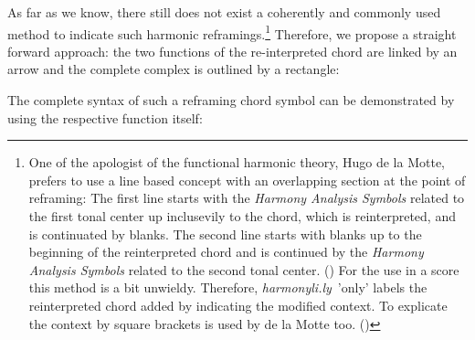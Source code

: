 \documentclass[
  DIV=calc,
  BCOR=5mm,
  12pt,
  headings=small,
  oneside,
  abstract=true,
  toc=bib,
  xcolor=dvipsnames,
  openany,
  ngerman,english]{scrartcl}
\newcommand{\hlyn}[0]{\textit{harmonyli.ly}}
\newcommand{\has}[1]{\textit{Harmony Analysis Symbol#1}}
\begin{document}
As far as we know, there still does not exist a coherently and commonly used
method to indicate such harmonic reframings.\footnote{One of the apologist of the
functional harmonic theory, Hugo de la Motte, prefers to use a line based
concept with an overlapping section at the point of reframing: The first line
starts with the \has{s} related to the first tonal center up inclusevily to the
chord, which is reinterpreted, and is continuated by blanks. The second line
starts with blanks up to the beginning of the reinterpreted chord and is
continued by the \has{s} related to the second tonal center. (\cite[cf.][144 et
passim]{Delamotte2011a}) For the use in a score this method is a bit unwieldy.
Therefore, \hlyn\ 'only' labels the reinterpreted chord added by indicating the
modified context. To explicate the context by square brackets is used by de la
Motte too. (\cite[cf.][226 et passim]{Delamotte2011a})} Therefore, we propose a
straight forward approach: the two functions of the re-interpreted chord are
linked by an arrow and the complete complex is outlined by a rectangle:

\begin{center}
\end{center}


The complete syntax of such a reframing chord symbol can be demonstrated by using
the respective function itself:
\end{document}
